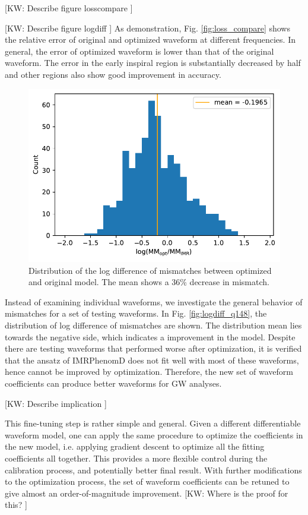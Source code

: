 \documentclass[twocolumn]{aastex631}
\newcommand{\kw}[1]{{\color{rb4}[KW: #1 ]}}
\begin{document}
\kw{Describe figure losscompare}

\kw{Describe figure logdiff}
As demonstration, Fig. \ref{fig:loss_compare} shows the relative error of original and optimized waveform at different frequencies. 
In general, the error of optimized waveform is lower than that of the original waveform. 
The error in the early inspiral region is substantially decreased by half and other regions also show good improvement in accuracy.   

\begin{figure}[t!]
\centering
\includegraphics[width=\linewidth]{../static/MM_logdiff_q148_LIGO.pdf}
\caption{Distribution of the log difference of mismatches between optimized
    and original model. The mean shows a 36\% decrease in mismatch. }
\label{fig:MM_logdiff}
\end{figure}


Instead of examining individual waveforms, we investigate the general behavior of mismatches for a set of testing waveforms. 
In Fig. \ref{fig:logdiff_q148}, the distribution of log difference of mismatches are shown. 
The distribution mean lies towards the negative side, which indicates a improvement in the model. 
Despite there are testing waveforms that performed worse after optimization, it is verified that the ansatz of IMRPhenomD does not fit well with most of these waveforms, hence cannot be improved by optimization.  
Therefore, the new set of waveform coefficients can produce better waveforms for GW analyses. 

\kw{Describe implication}

This fine-tuning step is rather simple and general. Given a different
differentiable waveform model, one can apply the same procedure to optimize the
coefficients in the new model, i.e. applying gradient descent to optimize all
the fitting coefficients all together. This provides a more flexible control
during the calibration process, and potentially better final result.
With further modifications to the optimization process, the set of waveform
coefficients can be retuned to give almost an order-of-magnitude improvement.
\kw{Where is the proof for this?} 
\end{document}
